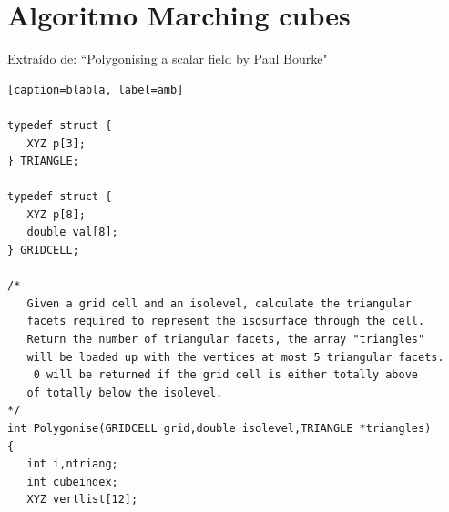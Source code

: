 \documentclass[12pt]{article}
\begin{document}
\section{Algoritmo Marching cubes}
Extraído de: ``Polygonising a scalar field by Paul Bourke" \cite{marching}
\begin{lstlisting}[frame=single, basicstyle=\scriptsize][caption=blabla, label=amb]

typedef struct {
   XYZ p[3];
} TRIANGLE;

typedef struct {
   XYZ p[8];
   double val[8];
} GRIDCELL;

/*
   Given a grid cell and an isolevel, calculate the triangular
   facets required to represent the isosurface through the cell.
   Return the number of triangular facets, the array "triangles"
   will be loaded up with the vertices at most 5 triangular facets.
	0 will be returned if the grid cell is either totally above
   of totally below the isolevel.
*/
int Polygonise(GRIDCELL grid,double isolevel,TRIANGLE *triangles)
{
   int i,ntriang;
   int cubeindex;
   XYZ vertlist[12];


\end{lstlisting}
\end{document}
